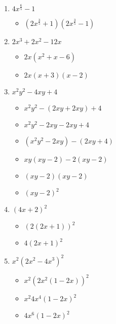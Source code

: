 \documentclass{article}
\begin{document}
\begin{onehalfspace}
\begin{enumerate}
        \item $4x^{\frac{6}{5}} - 1$
        \begin{itemize}
            \item $(2x^{\frac{3}{5}} + 1)(2x^{\frac{3}{5}} - 1)$
        \end{itemize}

        \item $2x^{3} + 2x^{2} - 12x$
        \begin{itemize}
            \item $2x(x^{2} + x - 6)$
            \item $2x(x + 3)(x - 2)$
        \end{itemize}

        \item $x^{2}y^{2} - 4xy + 4$
        \begin{itemize}
            \item $x^{2}y^{2} - (2xy + 2xy) + 4$
            \item $x^{2}y^{2} - 2xy - 2xy + 4$
            \item $(x^{2}y^{2} - 2xy) - (2xy + 4)$
            \item $xy(xy - 2) - 2(xy - 2)$
            \item $(xy - 2)(xy - 2)$
            \item $(xy - 2)^{2}$
        \end{itemize}

        \item $(4x + 2)^{2}$
        \begin{itemize}
            \item $(2(2x + 1))^{2}$
            \item $4(2x + 1)^{2}$
        \end{itemize}

        \item $x^{2}(2x^{2} - 4x^{3})^{2}$
        \begin{itemize}
            \item $x^{2}(2x^{2}(1 - 2x))^{2}$
            \item $x^{2}4x^{4}(1 - 2x)^{2}$
            \item $4x^{6}(1 - 2x)^{2}$
        \end{itemize}
    \end{enumerate}
\end{onehalfspace}
\end{document}
